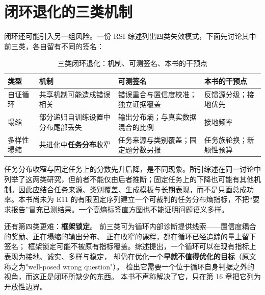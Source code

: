 \section{闭环退化的三类机制}
\label{sec:ch14-collapse}

\begin{sloppypar}
闭环还可能引入另一组风险。一份 RSI 综述列出四类失效模式，下面先讨论其中前三类\cite{rsi-survey-2607}，各自留有不同的签名：
\end{sloppypar}

\begin{table}[htbp]
\centering
\caption{三类闭环退化：机制、可测签名、本书的干预点}
\label{tab:ch14-collapse}
\begin{small}
\begin{tabular}{>{\raggedright\arraybackslash}p{2.4cm}>{\raggedright\arraybackslash}p{4.4cm}>{\raggedright\arraybackslash}p{3.4cm}>{\raggedright\arraybackslash}p{3.2cm}}
\toprule
类型 & 机制 & 可测签名 & 本书的干预点 \\
\midrule
自证循环 & 共享机制可能造成错误相关 & 错误重合与置信度校准；独立证据覆盖 & 反馈源分级；接地优先 \\
\midrule
塌缩 & 部分递归自训练设置中分布尾部丢失 & 输出分布熵；与真实数据混合的比例 & 接地频率 \\
\midrule
多样性塌缩 & 共进化中\textbf{任务分布}收窄 & 任务来源与类别覆盖；固定题分数另报 & 任务族轮换；新颖性预算 \\
\bottomrule
\end{tabular}
\end{small}
\end{table}

\begin{sloppypar}
任务分布收窄与固定任务上的分数先升后降，是不同现象。所引综述在同一讨论中列举了这两类研究，但前者不能仅由后者推断；固定任务上的下降也可能有其他机制\cite{rsi-survey-2607}。因此应结合任务来源、类别覆盖、生成模板与长期表现，而不是只画总成功率。本书尚未为 E11 的有限固定序列建立一个可裁判的任务分布熵指标，不把“要求报告”冒充已测结果。一个高熵标签直方图也不能证明问题语义多样。
\end{sloppypar}

\begin{sloppypar}
还有第四类更难：\textbf{框架锁定}。
前三类可为循环内部诊断提供线索——置信度耦合的奖励、正在塌缩的输出分布、
正在收窄的课程，都在循环已经追踪的量上留下签名；
框架锁定可能不被原有指标覆盖。综述提出，一个循环可以在现有指标上表现为接地、诚实、多样与稳定，
却仍在优化一个\textbf{早就不值得优化的目标}（原文称之为"well-posed wrong question"）。
检出它需要一个位于循环自身判据之外的视角，而这正是闭环所缺少的东西。
本书不声称解决了它\cite{rsi-survey-2607}，只在第 16 章把它列为开放性边界。
\end{sloppypar}

